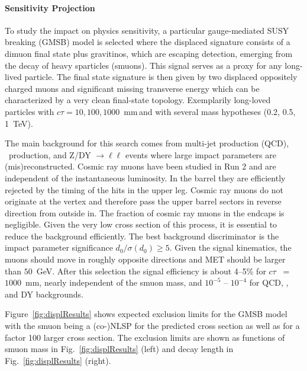 \paragraph{Sensitivity Projection}

To study the impact on physics sensitivity, a particular gauge-mediated SUSY breaking (GMSB) model is selected where
the displaced signature consists of a dimuon final state plus gravitinos, which are escaping detection, emerging from the decay of heavy sparticles (smuons).
This signal serves as a proxy for any long-lived particle.
The final state signature is then given by two displaced oppositely charged muons 
and significant missing transverse energy which can be characterized by a very clean final-state topology.
Exemplarily long-loved particles with $c\tau=10, 100, 1000$~mm\,and with several mass hypotheses (0.2, 0.5, 1~TeV).

The main background for this search comes from multi-jet production (QCD), \ttbar~production, 
and Z/DY $\to\ell\ell$ events  where large impact parameters are (mis)reconstructed. 
Cosmic ray muons have been studied in Run 2 and are independent of the instantaneous luminosity.
In the barrel they are efficiently rejected by the timing of the hits in the upper leg. Cosmic ray muons do not originate at the vertex and therefore pass the upper barrel sectors in reverse 
direction from outside in. The fraction of cosmic ray muons in the endcaps is negligible. 
Given the very low cross section of this process, 
it is essential to reduce the background efficiently. The best background discriminator 
is the impact parameter significance $d_0 / \sigma (d_0) \geq 5$.
Given the signal kinematics, the muons should move in roughly opposite directions
and MET should be larger than $50$~GeV. 
After this selection the signal efficiency is about 4--5\% for $c\tau$~ = $1000$~mm, 
nearly independent of the smuon mass, 
and $10^{-5}$ -- $10^{-4}$ for QCD, \ttbar, and DY backgrounds.

Figure~\ref{fig:displResults} shows expected exclusion limits for the GMSB model with the smuon being a (co-)NLSP for the predicted cross section as well as for a factor 100 larger cross section. The exclusion limits are shown as functions of smuon mass in  Fig.~\ref{fig:displResults} (left) and decay length in Fig.~\ref{fig:displResults} (right).

